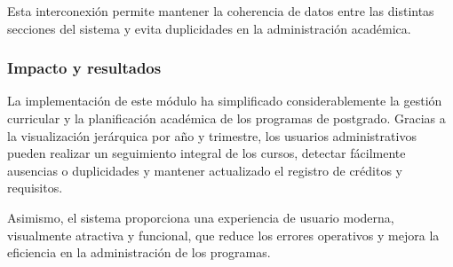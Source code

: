 Esta interconexión permite mantener la coherencia de datos entre las distintas secciones del sistema y evita duplicidades en la administración académica.

\subsubsection{Impacto y resultados}

La implementación de este módulo ha simplificado considerablemente la gestión curricular y la planificación académica de los programas de postgrado. Gracias a la visualización jerárquica por año y trimestre, los usuarios administrativos pueden realizar un seguimiento integral de los cursos, detectar fácilmente ausencias o duplicidades y mantener actualizado el registro de créditos y requisitos.

Asimismo, el sistema proporciona una experiencia de usuario moderna, visualmente atractiva y funcional, que reduce los errores operativos y mejora la eficiencia en la administración de los programas.


